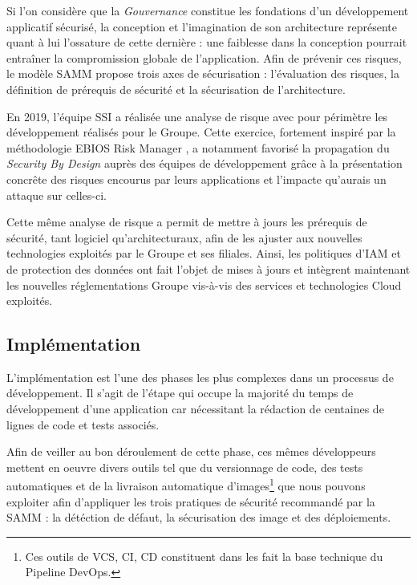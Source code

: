 Si l'on considère que la \emph{Gouvernance} constitue les fondations d'un développement applicatif sécurisé, la conception et 
l'imagination de son architecture représente quant à lui l'ossature de cette dernière : une faiblesse dans la conception pourrait
entraîner la compromission globale de l'application. 
\newline Afin de prévenir ces risques, le modèle \ac{SAMM} propose trois axes de sécurisation : l'évaluation des risques, 
la définition de prérequis de sécurité et la sécurisation de l'architecture.

En 2019, l'équipe \ac{SSI} a réalisée une analyse de risque avec pour périmètre les développement réalisés pour le Groupe. 
Cette exercice, fortement inspiré par la méthodologie EBIOS Risk Manager \autocite{ebios_rm_anssi_2018}, a notamment favorisé 
la propagation du \emph{Security By Design} auprès des équipes de développement grâce à la présentation concrête des risques 
encourus par leurs applications et l'impacte qu'aurais un attaque sur celles-ci.

Cette même analyse de risque a permit de mettre à jours les prérequis de sécurité, tant logiciel qu'architecturaux, afin de les
ajuster aux nouvelles technologies exploités par le Groupe et ses filiales. Ainsi, les politiques d’\ac{IAM}
et de protection des données ont fait l’objet de mises à jours et intègrent maintenant les nouvelles réglementations Groupe 
vis-à-vis des services et technologies Cloud exploités.

\subsection{Implémentation}

L'implémentation est l'une des phases les plus complexes dans un processus de développement. Il s'agit de l'étape
qui occupe la majorité du temps de développement d'une application car nécessitant la rédaction de centaines de lignes de 
code et tests associés.

Afin de veiller au bon déroulement de cette phase, ces mêmes développeurs mettent en oeuvre divers outils tel que du versionnage
de code, des tests automatiques et de la livraison automatique d'images\footnote{Ces outils de \ac{VCS}, \ac{CI}, \ac{CD} constituent
dans les fait la base technique du Pipeline DevOps.} que nous pouvons exploiter afin d'appliquer les trois pratiques de sécurité 
recommandé par la \ac{SAMM} : la détéction de défaut, la sécurisation des image et des déploiements.

